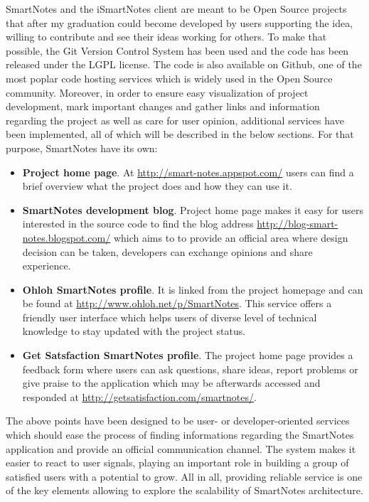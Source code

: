SmartNotes and the iSmartNotes client are meant to be Open Source projects that after my graduation could become developed by users supporting the idea, willing to contribute and see their ideas working for others. To make that possible, the Git Version Control System has been used and the code has been released under the LGPL license. The code is also available on Github, one of the most poplar code hosting services which is widely used in the Open Source community. Moreover, in order to ensure easy visualization of project development, mark important changes and gather links and information regarding the project as well as care for user opinion, additional services have been implemented, all of which will be described in the below sections. For that purpose, SmartNotes have its own:
\begin{itemize}
\item{\textbf{Project home page}. At \url{http://smart-notes.appspot.com/} users can find a brief overview what the project does and how they can use it.}
\item{\textbf{SmartNotes development blog}. Project home page makes it easy for users interested in the source code to find the blog address \url{http://blog-smart-notes.blogspot.com/} which aims to to provide an official area where design decision can be taken, developers can exchange opinions and share experience.}
\item{\textbf{Ohloh SmartNotes profile}. It is linked from the project homepage and can be found at \url{http://www.ohloh.net/p/SmartNotes}. This service offers a friendly user interface which helps users of diverse level of technical knowledge to stay updated with the project status.}
\item{\textbf{Get Satsfaction SmartNotes profile}. The project home page provides a feedback form where users can ask questions, share ideas, report problems or give praise to the application which may be afterwards accessed and responded at \url{http://getsatisfaction.com/smartnotes/}.}
\end{itemize}
The above points have been designed to be user- or developer-oriented services which should ease the process of finding informations regarding the SmartNotes application and provide an official communication channel. The system makes it easier to react to user signals, playing an important role in building a group of satisfied users with a potential to grow. All in all, providing reliable service is one of the key elements allowing to explore the scalability of SmartNotes architecture.
 
